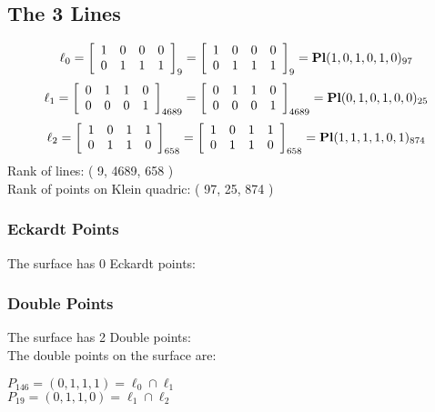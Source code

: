 \documentclass{article}
\begin{document}
{\subsection*{The 3 Lines}
$$
\ell_{0} = 
\left[
\begin{array}{*{4}{r}}
1 & 0 & 0 & 0\\
0 & 1 & 1 & 1\\
\end{array}
\right]
_{9}
=
\left[
\begin{array}{*{4}c}
1  & 0  & 0  & 0\\
0  & 1  & 1  & 1\\
\end{array}
\right]_{9}
={\rm\bf Pl}(1,0,1,0,1,0 )_{97}$$
$$
\ell_{1} = 
\left[
\begin{array}{*{4}{r}}
0 & 1 & 1 & 0\\
0 & 0 & 0 & 1\\
\end{array}
\right]
_{4689}
=
\left[
\begin{array}{*{4}c}
0  & 1  & 1  & 0\\
0  & 0  & 0  & 1\\
\end{array}
\right]_{4689}
={\rm\bf Pl}(0,1,0,1,0,0 )_{25}$$
$$
\ell_{2} = 
\left[
\begin{array}{*{4}{r}}
1 & 0 & 1 & 1\\
0 & 1 & 1 & 0\\
\end{array}
\right]
_{658}
=
\left[
\begin{array}{*{4}c}
1  & 0  & 1  & 1\\
0  & 1  & 1  & 0\\
\end{array}
\right]_{658}
={\rm\bf Pl}(1,1,1,1,0,1 )_{874}$$
Rank of lines: ( 9, 4689, 658 )\\
Rank of points on Klein quadric: ( 97, 25, 874 )\\
\subsubsection*{Eckardt Points}
The surface has 0 Eckardt points:\\
\subsubsection*{Double Points}
The surface has 2 Double points:\\
The double points on the surface are:\\
\begin{multicols}{2}
\noindent
$P_{146} = ( 0, 1, 1, 1 ) = \ell_{0} \cap \ell_{1} $\\
$P_{19} = ( 0, 1, 1, 0 ) = \ell_{1} \cap \ell_{2} $\\
\end{multicols}
}
\end{document}
